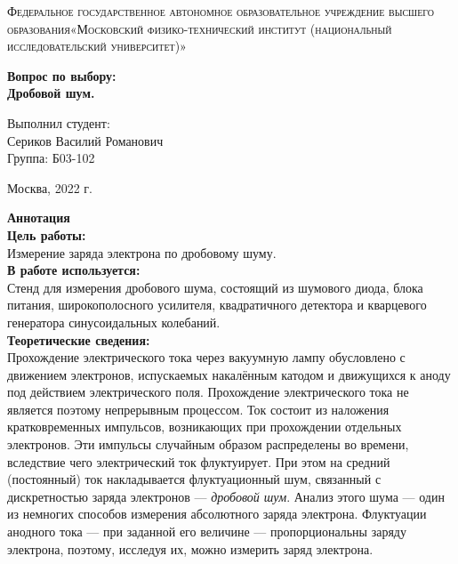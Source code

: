 \documentclass[a4paper, 12pt]{article}%
\begin{document}
	\begin{titlepage}
		\begin{center}
			\textsc{Федеральное государственное автономное образовательное учреждение высшего образования«Московский физико-технический институт (национальный исследовательский университет)»\\[5mm]
			}
			
			\vfill
			
			\textbf{Вопрос по выбору: \\[3mm]
			Дробовой шум.
				\\[50mm]
			}
			
		\end{center}
		
		\hfill
		\begin{minipage}{.5\textwidth}
			Выполнил студент:\\[2mm]
			Сериков Василий Романович\\[2mm]
			Группа: Б03-102\\[5mm]
			
		\end{minipage}
		\vfill
		\begin{center}
			Москва, 2022 г.
		\end{center}
		
	\end{titlepage}
	
	\newpage
	\textbf{Аннотация}\\
	
	
	\textbf{Цель работы: }\\
	Измерение заряда электрона по дробовому шуму.\\
	
	\textbf{В работе используется: }\\
	Стенд для измерения дробового шума, состоящий из шумового диода, блока питания, широкополосного усилителя, квадратичного детектора и кварцевого генератора синусоидальных колебаний.\\
	
	\textbf{Теоретические сведения: }\\
	
	Прохождение электрического тока через вакуумную
	лампу обусловлено с движением электронов, испускаемых накалённым
	катодом и движущихся к аноду под действием электрического поля. Прохождение электрического тока не является поэтому непрерывным процессом. Ток состоит из наложения кратковременных импульсов, возникающих при прохождении отдельных электронов. Эти импульсы случайным образом распределены во времени, вследствие чего электрический
	ток флуктуирует. При этом на средний (постоянный) ток накладывается
	флуктуационный шум, связанный с дискретностью заряда электронов —
	\textit{дробовой шум}. Анализ этого шума — один из немногих способов измерения абсолютного заряда электрона. Флуктуации анодного тока — при заданной его величине — пропорциональны заряду электрона, поэтому, исследуя их, можно измерить заряд электрона.
	
\end{document}
